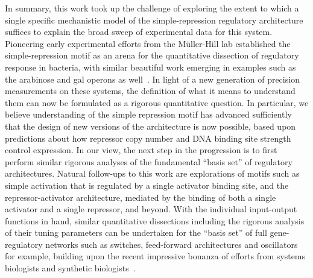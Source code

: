 In summary, this work took up the challenge of exploring the extent to which a
single specific mechanistic model of the simple-repression regulatory
architecture suffices to explain the broad sweep of experimental data for this
system. Pioneering early experimental efforts from the M\"{u}ller-Hill lab
established the simple-repression motif as an arena for the quantitative
dissection of regulatory response in bacteria, with similar beautiful work
emerging in examples such as the arabinose and gal operons as
well~\cite{Dunn1984b, Oehler1990, Weickert1993, Oehler1994, Schleif2000,
Semsey2002, SwintKruse2009}. In light of a new generation of precision
measurements on these systems, the definition of what it means to understand
them can now be formulated as a rigorous quantitative question. In particular,
we believe understanding of the simple repression motif has 
advanced sufficiently that the design of new
versions of the architecture is now possible,
based upon predictions about how repressor copy
number and DNA binding site strength control expression. In our view, the next
step in the progression is to first perform similar rigorous analyses of the
fundamental ``basis set'' of regulatory architectures. Natural follow-ups to this
work are explorations of motifs such as simple activation that is
regulated by a single activator binding site, and the repressor-activator
architecture, mediated by the binding of both a single activator and a single
repressor, and beyond. With the individual input-output functions in hand,
similar quantitative dissections including the rigorous analysis of their tuning
parameters can be undertaken for the ``basis set'' of full gene-regulatory
networks such as switches, feed-forward architectures and oscillators for
example, building upon the recent impressive bonanza of efforts from systems
biologists and synthetic biologists~\cite{Milo2002, Alon2007}.
